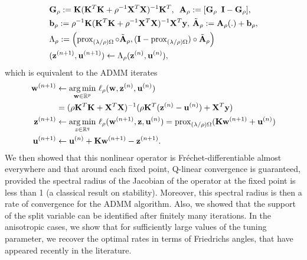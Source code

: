   \begin{eqnarray}
    \begin{aligned}
      &\mathbf{G}_{\rho} :=
      \mathbf{K}(\mathbf{K}^T\mathbf{K} + \rho^{-1}\mathbf{X}^T\mathbf{X})^{-1}\mathbf{K}^T,\hspace{.5em}
      \mathbf{A}_{\rho}:=[\mathbf{G}_{\rho}\hspace{.5em}\mathbf{I}-\mathbf{G}_{\rho}],\\
      &\mathbf{b}_{\rho} := \rho^{-1}\mathbf{K}(\mathbf{K}^T\mathbf{K} +
      \rho^{-1}\mathbf{X}^T\mathbf{X})^{-1}\mathbf{X}^T\mathbf{y},\hspace{.2em}\tilde{\mathbf{A}}_{\rho} :=
      \mathbf{A}_{\rho}(.) +  \mathbf{b}_{\rho},\\
      &\Lambda_{\rho} :=
        \left(\operatorname{prox}_{(\lambda/\rho)\Omega}\circ\tilde{\mathbf{A}}_{\rho},
        (\mathbf{I}-\operatorname{prox}_{(\lambda/\rho)\Omega})\circ\tilde{\mathbf{A}}_{\rho}\right)\\
        &(\mathbf{z}^{(n+1)}, \mathbf{u}^{(n+1)}) \leftarrow
        \Lambda_{\rho}(\mathbf{z}^{(n)}, \mathbf{u}^{(n)}),
    \end{aligned}
    \label{eq:factorize}
  \end{eqnarray}
which is equivalent to the ADMM iterates
\begin{eqnarray}
    \begin{split}
      \mathbf{w}^{(n+1)} &\leftarrow
      \underset{\mathbf{w} \in \mathbb R^p}{\operatorname*{arg\,min}}\text{ }\ell_{\rho}(\mathbf{w}, \mathbf{z}^{(n)},
      \mathbf{u}^{(n)}) \\
      &= (\rho \mathbf{K}^T\mathbf{K} + \mathbf{X}^T\mathbf{X})^{-1}(\rho\mathbf{K}^T(\mathbf{z}^{(n)} -
      \mathbf{u}^{(n)}) + \mathbf{X}^T\mathbf{y})\\
      \mathbf{z}^{(n+1)} &\leftarrow \underset{z \in \mathbb R^q}{\operatorname*{arg\,min}}\text{ }\ell_{\rho}(\mathbf{w}^{(n+1)},\mathbf{z}, \mathbf{u}^{(n)}) =
      \operatorname{prox}_{(\lambda/\rho)\Omega}(\mathbf{K}\mathbf{w}^{(n+1)} + \mathbf{u}^{(n)})\\
      \mathbf{u}^{(n+1)} &\leftarrow \mathbf{u}^{(n)} + \mathbf{K}\mathbf{w}^{(n+1)} -\mathbf{z}^{(n+1)}.
    \end{split}
\label{eq:admm}
\end{eqnarray}
We then showed that this nonlinear operator is
Fr\'echet-differentiable almost everywhere and that around each fixed
point, Q-linear convergence is guaranteed, provided the spectral
radius of the Jacobian of the operator at the fixed point is less than
1 (a classical result on stability). Moreover, this spectral radius is
then a rate of convergence for the ADMM algorithm. Also, we showed that
the support of the split variable can be identified after finitely
many iterations. In the anisotropic cases, we show that for
sufficiently large values of the tuning parameter, we recover the
optimal rates in terms of Friedrichs angles, that have appeared
recently in the literature.

